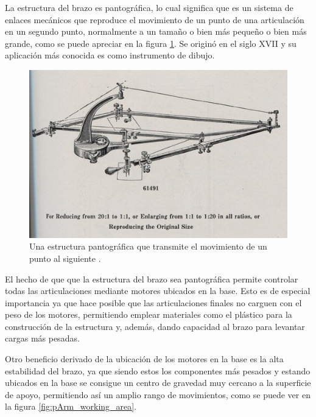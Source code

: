 La estructura del brazo es pantográfica, lo cual significa que es un sistema de enlaces mecánicos que reproduce el movimiento de un punto de una articulación en un segundo punto, normalmente a un tamaño o bien más pequeño o bien más grande, como se puede apreciar en la figura \ref{fig:estrucutra_pantografica}. Se originó en el siglo XVII y su aplicación más conocida es como instrumento de dibujo.

\begin{figure}[H]
    \centering
    \includegraphics[width=.7\linewidth]{pictures/link-to-elliott-p149-suspended-pantograph-sf0.jpg}
    \caption{Una estructura pantográfica que transmite el movimiento de un punto al siguiente \cite{PantographContext}.}
    \label{fig:estrucutra_pantografica}
\end{figure}

El hecho de que que la estructura del brazo sea pantográfica permite controlar todas las articulaciones mediante motores ubicados en la base. Esto es de especial importancia ya que hace posible que las articulaciones finales no carguen con el peso de los motores, permitiendo emplear materiales como el plástico para la construcción de la estructura y, además, dando capacidad al brazo para levantar cargas más pesadas.

Otro beneficio derivado de la ubicación de los motores en la base es la alta estabilidad del brazo, ya que siendo estos los componentes más pesados y estando ubicados en la base se consigue un centro de gravedad muy cercano a la superficie de apoyo, permitiendo así un amplio rango de movimientos, como se puede ver en la figura \ref{fig:pArm_working_area}.

